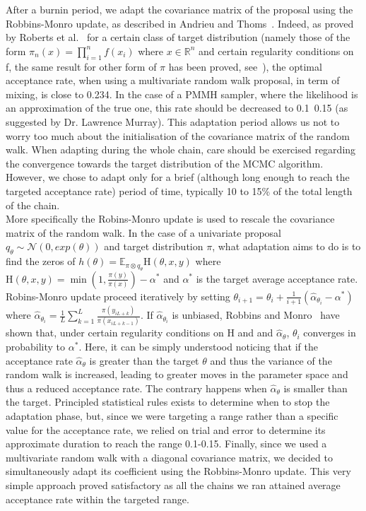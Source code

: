 \documentclass[12pt]{article}
\begin{document}
	After a burnin period, we adapt the covariance matrix of the proposal using the Robbins-Monro update, as described in Andrieu and Thoms~\cite{Andrieu2008}. Indeed, as proved by Roberts et al.~\cite{roberts1997weak} for a certain class of target distribution (namely those of the form $\pi_n(x) = \prod_{i=1}^{n}f(x_i)$ where $x \in \mathbb{R}^n$ and certain regularity conditions on f, the same result for other form of $\pi$ has been proved, see~\cite{roberts2001optimal}), the optimal acceptance rate, when using a multivariate random walk proposal, in term of mixing, is close to 0.234. In the case of a PMMH sampler, where the likelihood is an approximation of the true one, this rate should be decreased to 0.1~0.15 (as suggested by Dr. Lawrence Murray). This adaptation period allows us not to worry too much about the initialisation of the covariance matrix of the random walk. When adapting during the whole chain, care should be exercised regarding the convergence towards the target distribution of the MCMC algorithm. However, we chose to adapt only for a brief (although long enough to reach the targeted acceptance rate) period of time, typically 10 to 15\% of the total length of the chain.\\
	
	More specifically the Robins-Monro update is used to rescale the covariance matrix of the random walk. In the case of a univariate proposal $q_\theta \sim \mathcal{N}(0, exp(\theta))$ and target distribution $\pi$,  what adaptation aims to do is to find the zeros of $h(\theta) = \mathbb{E}_{\pi\otimes q_\theta}\mathrm{H}(\theta, x, y)$ where $\mathrm{H}(\theta, x, y) = \min(1, \frac{\pi(y)}{\pi(x)}) - \alpha^*$ and $\alpha^*$ is the target average acceptance rate. Robins-Monro update proceed iteratively by setting $\theta_{i+1} = \theta_i + \frac{1}{i+1}(\hat{\alpha}_{\theta_i} - \alpha^*)$ where $\hat{\alpha}_{\theta_i} = \frac{1}{L}\sum_{k=1}^{L}\frac{\pi(y_{iL+k})}{\pi(x_{iL+k-1})}$. If $\hat{\alpha}_{\theta_i}$ is unbiased, Robbins and Monro~\cite{robbins1951stochastic} have shown that, under certain regularity conditions on H and and $\hat{\alpha}_\theta$, $\theta_i$ converges in probability to $\alpha^*$. Here, it can be simply understood noticing that if the acceptance rate $\hat{\alpha}_\theta$ is greater than the target $\theta$ and thus the variance of the random walk is increased, leading to greater moves in the parameter space and thus a reduced acceptance rate. The contrary happens when $\hat{\alpha}_\theta$ is smaller than the target. Principled statistical rules exists to determine when to stop the adaptation phase, but, since we were targeting a range rather than a specific value for the acceptance rate,  we relied on trial and error to determine its approximate duration to reach the range 0.1-0.15. Finally, since we used a multivariate random walk with a diagonal covariance matrix, we decided to simultaneously adapt its coefficient using the Robbins-Monro update. This very simple approach proved satisfactory as all the chains we ran attained average acceptance rate within the targeted range.
	
\end{document}
